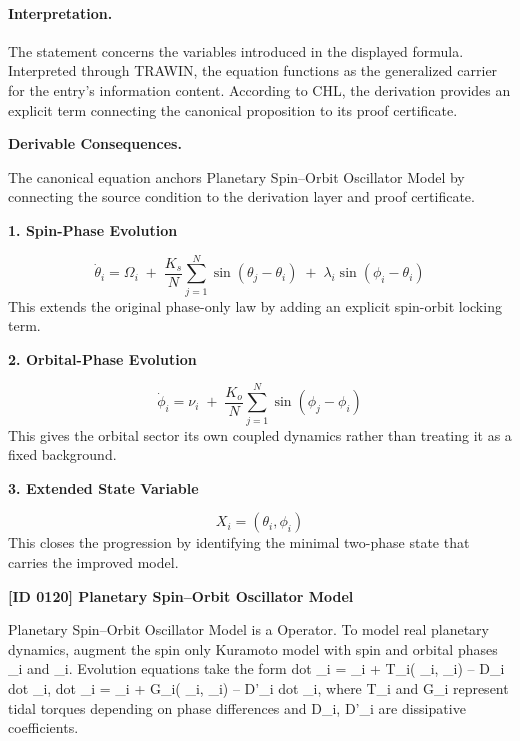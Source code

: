 \paragraph{Interpretation.}
The statement concerns the variables introduced in the displayed formula. Interpreted through TRAWIN, the equation functions as the generalized carrier for the entry’s information content. According to CHL, the derivation provides an explicit term connecting the canonical proposition to its proof certificate.

\par\vspace{0.35em}
\noindent\textbf{Derivable Consequences.}\quad
\begingroup
\footnotesize
\raggedright
The canonical equation anchors Planetary Spin--Orbit Oscillator Model by connecting the source condition to the derivation layer and proof certificate.
\par\endgroup

\noindent\textbf{1. Spin-Phase Evolution}\par
\[
\dot{\theta}_i
=
\Omega_i
\;+\;
\frac{K_s}{N}\sum_{j=1}^{N}\sin(\theta_j-\theta_i)
\;+\;
\lambda_i\sin(\phi_i-\theta_i)
\]
\noindent This extends the original phase-only law by adding an explicit spin-orbit locking term.\par
\noindent\textbf{2. Orbital-Phase Evolution}\par
\[
\dot{\phi}_i
=
\nu_i
\;+\;
\frac{K_o}{N}\sum_{j=1}^{N}\sin(\phi_j-\phi_i)
\]
\noindent This gives the orbital sector its own coupled dynamics rather than treating it as a fixed background.\par
\noindent\textbf{3. Extended State Variable}\par
\[
X_i=(\theta_i,\phi_i)
\]
\noindent This closes the progression by identifying the minimal two-phase state that carries the improved model.\par

\clearpage
\noindent\textbf{[ID 0120] Planetary Spin--Orbit Oscillator Model}\par
\vspace{0.35em}
\begingroup\small
{}
Planetary Spin--Orbit Oscillator Model is a Operator. To model real planetary dynamics, augment the spin only Kuramoto model with spin and orbital phases  \_i and  \_i. Evolution equations take the form dot  \_i =  \_i +   T\_i( \_i,  \_i) -- D\_i   dot  \_i, dot  \_i =  \_i +   G\_i( \_i,  \_i) -- D'\_i   dot  \_i, where T\_i and G\_i represent tidal torques depending on phase differences and D\_i, D'\_i are dissipative coefficients.

